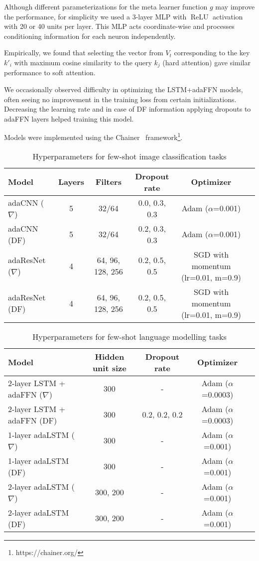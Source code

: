 \documentclass{article}
\DeclareMathOperator*{\relu}{ReLU}
\begin{document}
Although different parameterizations for the meta learner function $g$ may improve the performance, for simplicity we used a 3-layer MLP with $\relu$ activation with 20 or 40 units per layer. This MLP acts coordinate-wise and processes conditioning information for each neuron independently.

Empirically, we found that selecting the vector from $V_t$ corresponding to the key $k'_i$ with maximum cosine similarity to the query $k_j$ (hard attention) gave similar performance to soft attention.

We occasionally observed difficulty in optimizing the LSTM+adaFFN models, often seeing no improvement in the training loss from certain initializations. Decreasing the learning rate and in case of DF information applying dropouts to adaFFN layers helped training this model.

Models were implemented using the Chainer~\citep{chainer_learningsys2015} framework\footnote{https://chainer.org/}.


\begin{table}[h]
  \centering
  \caption{Hyperparameters for few-shot image classification tasks}
  \label{tab:hyper-img}
  \small
\begin{tabular}{lccccc}
    \toprule
        \bf Model & \bf Layers & \bf Filters & \bf Dropout rate & \bf Optimizer \\
    \midrule
        adaCNN ($\nabla$) & 5 & 32/64 & 0.0, 0.3, 0.3 &	Adam ($\alpha$=0.001) \\
        adaCNN (DF) & 5 &	32/64 &	0.2, 0.3, 0.3 &	Adam ($\alpha$=0.001) \\
        adaResNet ($\nabla$) & 4 &	64, 96, 128, 256 &	0.2, 0.5, 0.5 & SGD with momentum (lr=0.01, m=0.9) \\
        adaResNet (DF) & 4 & 64, 96, 128, 256 &	0.2, 0.5, 0.5 & SGD with momentum (lr=0.01, m=0.9) \\
    \bottomrule
  \end{tabular}
\end{table}


\begin{table}[h]
\vskip -0.5cm
  \caption{Hyperparameters for few-shot language modelling tasks}
  \label{tab:hyper-lm}
  \small
  \centering
  \begin{tabular}{lcccc}
    \toprule
        \bf Model & \bf Hidden unit size & \bf Dropout rate & \bf Optimizer \\
    \midrule
2-layer LSTM + adaFFN ($\nabla$) &	300 &	- &	Adam ($\alpha$=0.0003) \\
        2-layer LSTM + adaFFN (DF) &	300 &	0.2, 0.2, 0.2 & Adam ($\alpha$=0.0003) \\
        1-layer adaLSTM ($\nabla$) &	300 &	- &	Adam ($\alpha$=0.001) \\
        1-layer adaLSTM (DF) &	300 &	- &	Adam ($\alpha$=0.001) \\
        2-layer adaLSTM ($\nabla$) &	300, 200 &	- &	Adam ($\alpha$=0.001) \\
        2-layer adaLSTM (DF) &	300, 200 &	- &	Adam ($\alpha$=0.001) \\
    \bottomrule
  \end{tabular}
\end{table}
\end{document}
